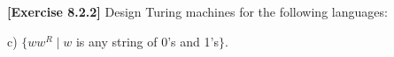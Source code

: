 \textbf{[Exercise 8.2.2]} Design Turing machines for the following languages:

c) $\{ww^R\mid w $ is any string of 0's and 1's$\}$.